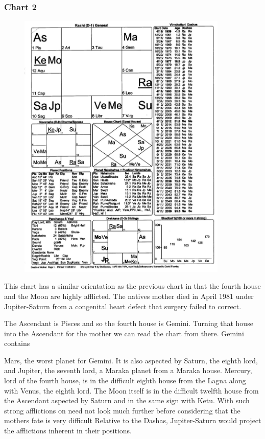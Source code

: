  

\subsubsection{Chart 2}


 \begin{figure}[h]
\centering
\includegraphics[width=10cm]{pics/Lesson6chart2.jpg}
\caption{}
\end{figure}

This chart has a similar orientation as the previous chart in that the fourth house and the Moon are highly afflicted. The natives mother died in April 1981 under Jupiter-Saturn from a congenital heart defect that surgery failed to correct.

 

The Ascendant is Pisces and so the fourth house is Gemini. Turning that house into the Ascendant for the mother we can read the chart from there. Gemini contains

 



 

Mars, the worst planet for Gemini. It is also aspected by Saturn, the eighth lord, and Jupiter, the seventh lord, a Maraka planet from a Maraka house. Mercury, lord of the fourth house, is in the difficult eighth house from the Lagna along with Venus, the eighth lord. The Moon itself is in the difficult twelfth house from the Ascendant aspected by Saturn and in the same sign with Ketu. With such strong afflictions on need not look much further before considering that the mothers fate is very difficult Relative to the Dashas, Jupiter-Saturn would project the afflictions inherent in their positions.

